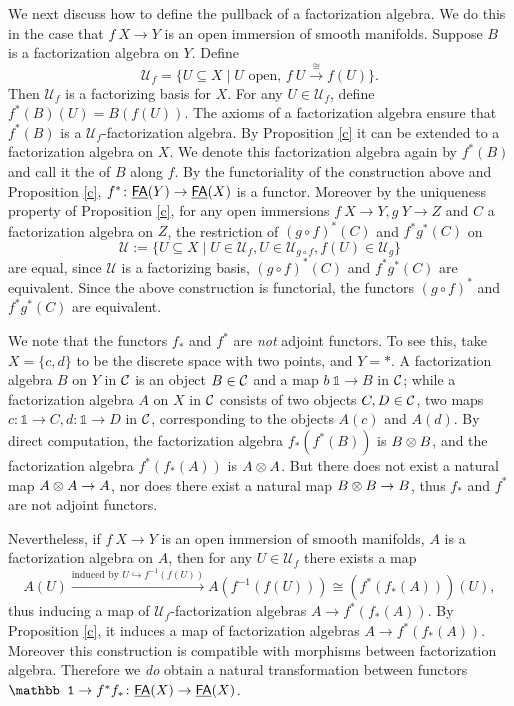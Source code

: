 \documentclass[twoside]{article}
\begin{document}
We next discuss how to define the pullback of a factorization algebra.
We do this in the case that $f\:X\to Y$ is an open immersion of smooth manifolds.
Suppose $B$ is a factorization algebra on $Y$. Define \[\mathscr U_f=
\{U\subseteq X\mid U\text{ open, }f\:U\xrightarrow{\cong}f(U)\}.\]
Then $\mathscr U_f$ is a factorizing basis for $X$. For any $U\in\mathscr U_f$,
define $f^*(B)(U)=B(f(U))$. The axioms of a factorization algebra ensure that
$f^*(B)$ is a $\mathscr U_f$-factorization algebra. By Proposition \ref{c}
it can be extended to a factorization algebra on $X$. We denote this 
factorization algebra again by $f^*(B)$ and call it the 
of $B$ along $f$. By the functoriality of the construction above and 
Proposition \ref{c}, $f^*\colon\underline{\smash{\mathsf{FA}}}(Y)\to\underline{\smash{\mathsf{FA}}}(X)$ is a functor. Moreover by the 
uniqueness property of Proposition \ref{c}, for any open immersions 
$f\:X\to Y, g\:Y\to Z$ and $C$ a factorization algebra on $Z$, the restriction
of $(g\circ f)^*(C)$ and $f^*g^*(C)$ on \[\mathscr U:=\{U\subseteq X\mid 
U\in\mathscr U_f,U\in \mathscr U_{g\circ f},f(U)\in \mathscr U_g\}\] are 
equal, since $\mathscr U$ is a factorizing basis, $(g\circ f)^*(C)$ 
and $f^*g^*(C)$ are equivalent. Since the above construction is functorial,
the functors $(g\circ f)^*$ and $f^*g^*(C)$ are equivalent.

\begin{remark}
    We note that the functors $f_*$ and $f^*$ are \textit{not} adjoint functors.
    To see this, take $X=\{c,d\}$ to be the discrete space with two points,
    and $Y=*$. A factorization algebra $B$ on $Y$ in $\cal C$ is an object
    $B\in\cal C$ and a map $b\:\mathbb1\to B$ in $\cal C$; while a
    factorization algebra $A$ on $X$ in $\cal C$ consists of two objects 
    $C,D\in\cal C$, two maps $c:\mathbb1\to C,d:\mathbb1\to D$ in $\cal C$,
    corresponding to the objects $A(c)$ and $A(d)$. By direct computation,
    the factorization algebra $f_*(f^*(B))$ is $B\otimes B$, and the 
    factorization algebra $f^*(f_*(A))$ is $A\otimes A$. But there does not exist a
    natural map $A\otimes A\to A$, nor does there exist a natural map $B\otimes B\to B$,
    thus $f_*$ and $f^*$ are not adjoint functors.

    Nevertheless, if $f\:X\to Y$ is an open immersion of smooth manifolds,
    $A$ is a factorization algebra on $A$, then for any $U\in\mathscr U_f$
    there exists a map $$A(U)\xrightarrow{\text{induced by }U\hookrightarrow
    f^{-1}(f(U))}A(f^{-1}(f(U)))\cong (f^*(f_*(A)))(U),$$ thus inducing a map of
    $\mathscr U_f$-factorization algebras $A\to f^*(f_*(A))$. By Proposition
    \ref{c}, it induces a map of factorization algebras $A\to f^*(f_*(A))$.
    Moreover this construction is compatible with morphisms between
    factorization algebra. Therefore we \textit{do} obtain a natural transformation
    between functors $\mathbb1\to f^*f_*\:\FA(X)\to\FA(X)$.
\end{remark}
\end{document}
